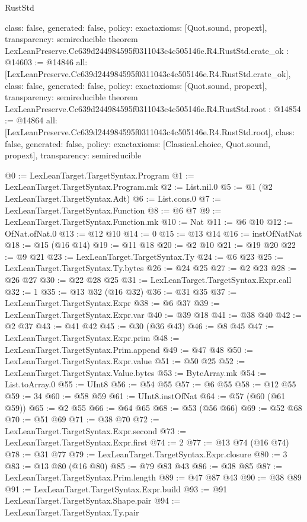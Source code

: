 \begin{lexlean}{RustStd}
\begin{coremodule}
{  class: false,
  generated: false,
  policy: exact{axioms: [Quot.sound, propext]},
  transparency: semireducible
}
theorem LexLeanPreserve.Cc639d244984595f0311043c4c505146e.R4.RustStd.crate_ok : @14603 := @14846 {
  all: [LexLeanPreserve.Cc639d244984595f0311043c4c505146e.R4.RustStd.crate_ok],
  class: false,
  generated: false,
  policy: exact{axioms: [Quot.sound, propext]},
  transparency: semireducible
}
theorem LexLeanPreserve.Cc639d244984595f0311043c4c505146e.R4.RustStd.root : @14854 := @14864 {
  all: [LexLeanPreserve.Cc639d244984595f0311043c4c505146e.R4.RustStd.root],
  class: false,
  generated: false,
  policy: exact{axioms: [Classical.choice, Quot.sound, propext]},
  transparency: semireducible
}

@0 := LexLeanTarget.TargetSyntax.Program
@1 := LexLeanTarget.TargetSyntax.Program.mk
@2 := List.nil.{0}
@5 := @1 (@2 LexLeanTarget.TargetSyntax.Adt)
@6 := List.cons.{0}
@7 := LexLeanTarget.TargetSyntax.Function
@8 := @6 @7
@9 := LexLeanTarget.TargetSyntax.Function.mk
@10 := Nat
@11 := @6 @10
@12 := OfNat.ofNat.{0}
@13 := @12 @10
@14 := 0
@15 := @13 @14
@16 := instOfNatNat
@18 := @15 (@16 @14)
@19 := @11 @18
@20 := @2 @10
@21 := @19 @20
@22 := @9 @21
@23 := LexLeanTarget.TargetSyntax.Ty
@24 := @6 @23
@25 := LexLeanTarget.TargetSyntax.Ty.bytes
@26 := @24 @25
@27 := @2 @23
@28 := @26 @27
@30 := @22 @28 @25
@31 := LexLeanTarget.TargetSyntax.Expr.call
@32 := 1
@35 := @13 @32 (@16 @32)
@36 := @31 @35
@37 := LexLeanTarget.TargetSyntax.Expr
@38 := @6 @37
@39 := LexLeanTarget.TargetSyntax.Expr.var
@40 := @39 @18
@41 := @38 @40
@42 := @2 @37
@43 := @41 @42
@45 := @30 (@36 @43)
@46 := @8 @45
@47 := LexLeanTarget.TargetSyntax.Expr.prim
@48 := LexLeanTarget.TargetSyntax.Prim.append
@49 := @47 @48
@50 := LexLeanTarget.TargetSyntax.Expr.value
@51 := @50 @25
@52 := LexLeanTarget.TargetSyntax.Value.bytes
@53 := ByteArray.mk
@54 := List.toArray.{0}
@55 := UInt8
@56 := @54 @55
@57 := @6 @55
@58 := @12 @55
@59 := 34
@60 := @58 @59
@61 := UInt8.instOfNat
@64 := @57 (@60 (@61 @59))
@65 := @2 @55
@66 := @64 @65
@68 := @53 (@56 @66)
@69 := @52 @68
@70 := @51 @69
@71 := @38 @70
@72 := LexLeanTarget.TargetSyntax.Expr.second
@73 := LexLeanTarget.TargetSyntax.Expr.first
@74 := 2
@77 := @13 @74 (@16 @74)
@78 := @31 @77
@79 := LexLeanTarget.TargetSyntax.Expr.closure
@80 := 3
@83 := @13 @80 (@16 @80)
@85 := @79 @83 @43
@86 := @38 @85
@87 := LexLeanTarget.TargetSyntax.Prim.length
@89 := @47 @87 @43
@90 := @38 @89
@91 := LexLeanTarget.TargetSyntax.Expr.build
@93 := @91 LexLeanTarget.TargetSyntax.Shape.pair
@94 := LexLeanTarget.TargetSyntax.Ty.pair

\end{coremodule}
\end{lexlean}
